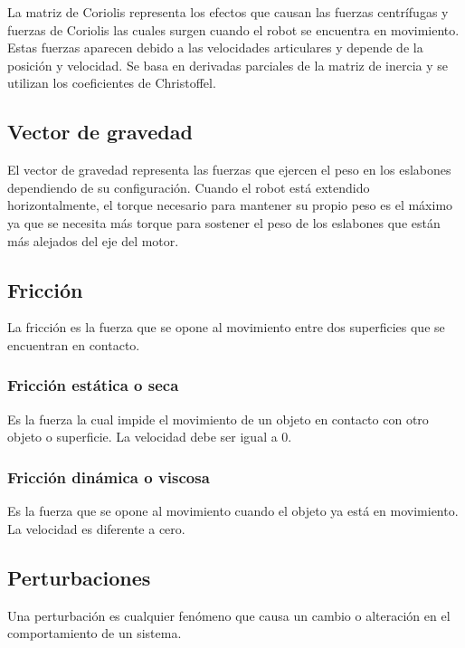 La matriz de Coriolis representa los efectos que causan las fuerzas centrífugas y fuerzas de Coriolis las cuales surgen cuando el robot se encuentra en movimiento. Estas fuerzas aparecen debido a las velocidades articulares y depende de la posición y velocidad. 
Se basa en derivadas parciales de la matriz de inercia y se utilizan los coeficientes de Christoffel. 

\subsection{Vector de gravedad}

El vector de gravedad representa las fuerzas que ejercen el peso en los eslabones dependiendo de su configuración. Cuando el robot está extendido horizontalmente, el torque necesario para mantener su propio peso es el máximo ya que se necesita más torque para sostener el peso de los eslabones que están más alejados del eje del motor. 

\subsection{Fricción}

La fricción es la fuerza que se opone al movimiento entre dos superficies que se encuentran en contacto.

\subsubsection{Fricción estática o seca}

Es la fuerza la cual impide el movimiento de un objeto en contacto con otro objeto o superficie. La velocidad debe ser igual a 0.
 
\subsubsection{Fricción dinámica o viscosa}

Es la fuerza que se opone al movimiento cuando el objeto  ya está en  movimiento. La velocidad es diferente a cero. 



\subsection{Perturbaciones}
Una perturbación es cualquier fenómeno que causa un cambio o alteración en el comportamiento de un sistema. 
